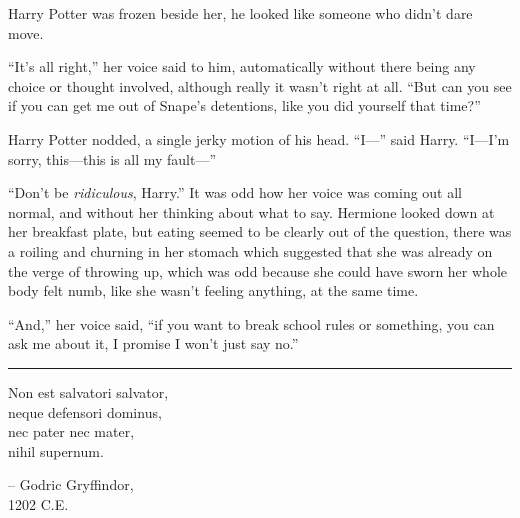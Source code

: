Harry Potter was frozen beside her, he looked like someone who didn't
dare move.

``It's all right,'' her voice said to him, automatically without there
being any choice or thought involved, although really it wasn't right at
all. ``But can you see if you can get me out of Snape's detentions, like
you did yourself that time?''

Harry Potter nodded, a single jerky motion of his head. ``I---'' said
Harry. ``I---I'm sorry, this---this is all my fault---''

``Don't be \emph{ridiculous}, Harry.'' It was odd how her voice was
coming out all normal, and without her thinking about what to say.
Hermione looked down at her breakfast plate, but eating seemed to be
clearly out of the question, there was a roiling and churning in her
stomach which suggested that she was already on the verge of throwing
up, which was odd because she could have sworn her whole body felt numb,
like she wasn't feeling anything, at the same time.

``And,'' her voice said, ``if you want to break school rules or
something, you can ask me about it, I promise I won't just say no.''

\begin{center}\rule{3in}{0.4pt}\end{center}

Non est salvatori salvator,\\neque defensori dominus,\\nec pater nec
mater,\\nihil supernum.

-- Godric Gryffindor,\\ 1202 C.E.
